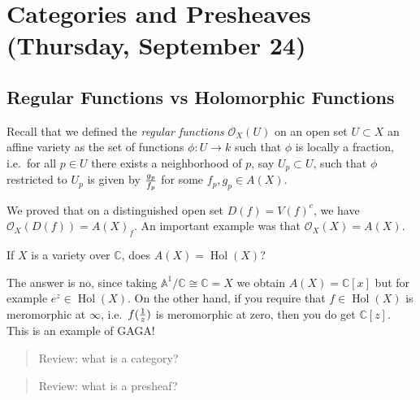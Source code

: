 \hypertarget{categories-and-presheaves-thursday-september-24}{%
\section{Categories and Presheaves (Thursday, September
24)}\label{categories-and-presheaves-thursday-september-24}}

\hypertarget{regular-functions-vs-holomorphic-functions}{%
\subsection{Regular Functions vs Holomorphic
Functions}\label{regular-functions-vs-holomorphic-functions}}

Recall that we defined the \emph{regular functions}
\({\mathcal{O}}_X(U)\) on an open set \(U\subset X\) an affine variety
as the set of functions \(\phi: U\to k\) such that \(\phi\) is locally a
fraction, i.e.~for all \(p\in U\) there exists a neighborhood of \(p\),
say \(U_p \subset U\), such that \(\phi\) restricted to \(U_p\) is given
by \(g_p \over f_p\) for some \(f_p, g_p \in A(X)\).

We proved that on a distinguished open set \(D(f) = V(f)^c\), we have
\({\mathcal{O}}_X(D(f)) = A(X)_f\). An important example was that
\({\mathcal{O}}_X(X) = A(X)\).

\begin{question}

If \(X\) is a variety over \({\mathbb{C}}\), does
\(A(X) = \operatorname{Hol}(X)\)?

\end{question}

\begin{answer}

The answer is no, since taking
\({\mathbb{A}}^1/{\mathbb{C}}\cong {\mathbb{C}}= X\) we obtain
\(A(X) = {\mathbb{C}}[x]\) but for example
\(e^z \in \operatorname{Hol}(X)\). On the other hand, if you require
that \(f\in \operatorname{Hol}(X)\) is meromorphic at \(\infty\),
i.e.~\(f({1\over z})\) is meromorphic at zero, then you do get
\({\mathbb{C}}[z]\). This is an example of GAGA!

\end{answer}

\begin{quote}
Review: what is a category?
\end{quote}

\begin{quote}
Review: what is a presheaf?
\end{quote}

